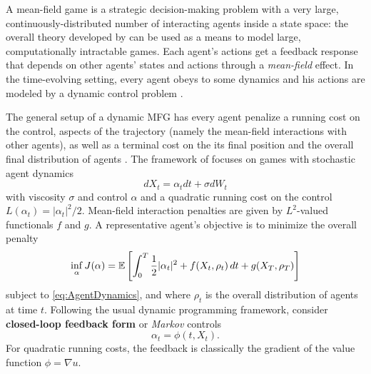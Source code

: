 \documentclass[../report.tex]{subfiles}
\begin{document}
A mean-field game \cite{LASRY2006619,LASRY2006679} is a strategic decision-making problem with a very large, continuously-distributed number of interacting agents inside a state space: the overall theory developed by \citeauthor{LASRY2006619} can be used as a means to model large, computationally intractable games. Each agent's actions get a feedback response that depends on other agents' states and actions through a \textit{mean-field} effect. In the time-evolving setting, every agent obeys to some dynamics and his actions are modeled by a dynamic control problem \cite{LASRY2006679}.

The general setup of a dynamic MFG has every agent penalize a running cost on the control, aspects of the trajectory (namely the mean-field interactions with other agents), as well as a terminal cost on the its final position and the overall final distribution of agents \cite{LASRY2006679}.
The framework of \cites{benamou:hal-01295299}{benamou2018entropy} focuses on games with stochastic agent dynamics 
\begin{equation}\label{eq:AgentDynamics}
dX_t = \alpha_tdt + \sigma dW_t
\end{equation}
with viscosity $\sigma$ and control $\alpha$ and a quadratic running cost on the control $L(\alpha_t) = |\alpha_t|^2/2$. Mean-field interaction penalties are given by $L^2$-valued functionals $f$ and $g$. A representative agent's objective is to minimize the overall penalty
\begin{equation}
\inf_{\alpha} J(\alpha) = \mathbb{E}\left[
\int_0^T \frac{1}{2}|\alpha_t|^2 + f(X_t, \rho_t) \,dt
+ g(X_T, \rho_T)
\right]
\end{equation}
subject to \cref{eq:AgentDynamics}, and where $\rho_t$ is the overall distribution of agents at time $t$. Following the usual dynamic programming framework, \textcite{LASRY2006679} consider \textbf{closed-loop feedback form} or \textit{Markov} controls
\begin{equation}
	\alpha_t = \phi(t, X_t).
\end{equation}
For quadratic running costs, the feedback is classically the gradient of the value function $\phi = \nabla u$.
\end{document}
